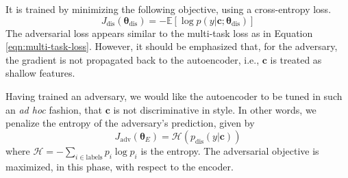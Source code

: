 \documentclass[11pt,a4paper]{article}
\newcommand{\loss}[1]{J_\text{#1}}
\begin{document}
It is trained by minimizing the following objective, using a cross-entropy loss.
\begin{equation} \label{eqn:adv-disc-loss}
	\loss{dis}(\bm\theta_\text{dis}) =
	- \mathbb{E} [\log p(y | \bm c; \bm\theta_\text{dis})]
\end{equation}
The adversarial loss appears similar to the multi-task loss as in Equation \ref{eqn:multi-task-loss}. However, it should be emphasized that, for the adversary, the gradient is not propagated back to the autoencoder, i.e., $\bm c$ is treated as shallow features.

Having trained an adversary, we would like the autoencoder to be tuned in such an \textit{ad hoc} fashion, that $\bm c$ is not discriminative in style. In other words, we penalize the entropy of the adversary's prediction, given by
\begin{equation}
	\loss{adv}(\bm\theta_E)=\mathcal{H}(p_\text{dis}(y|\bm c))
\end{equation}
where $\mathcal{H}=-\sum_{i\in\text{labels}}p_i\log p_i$ is the entropy. The adversarial objective is maximized, in this phase, with respect to the encoder.
\end{document}
